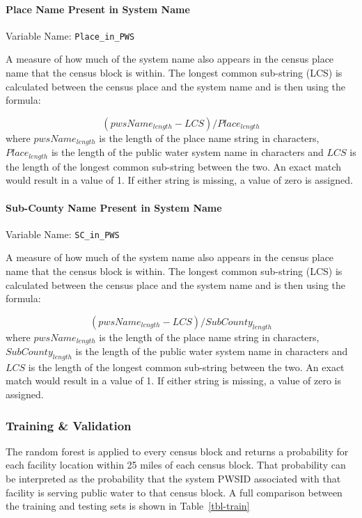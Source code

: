\documentclass[
  letterpaper,
  DIV=11,
  numbers=noendperiod,
  oneside]{scrartcl}
\let\oldparagraph\paragraph
\renewcommand{\paragraph}[1]{\oldparagraph{#1}\mbox{}}
\begin{document}
\paragraph{Place Name Present in System
Name}\label{place-name-present-in-system-name}

Variable Name: \texttt{Place\_in\_PWS}

A measure of how much of the system name also appears in the census
place name that the census block is within. The longest common
sub-string (LCS) is calculated between the census place and the system
name and is then using the formula:

\[(pwsName_{length}-LCS)/Place_{length}\] where \(pwsName_{length}\) is
the length of the place name string in characters, \(Place_{length}\) is
the length of the public water system name in characters and \(LCS\) is
the length of the longest common sub-string between the two. An exact
match would result in a value of 1. If either string is missing, a value
of zero is assigned.

\paragraph{Sub-County Name Present in System
Name}\label{sub-county-name-present-in-system-name}

Variable Name: \texttt{SC\_in\_PWS}

A measure of how much of the system name also appears in the census
place name that the census block is within. The longest common
sub-string (LCS) is calculated between the census place and the system
name and is then using the formula:

\[(pwsName_{length}-LCS)/SubCounty_{length}\] where \(pwsName_{length}\)
is the length of the place name string in characters,
\(SubCounty_{length}\) is the length of the public water system name in
characters and \(LCS\) is the length of the longest common sub-string
between the two. An exact match would result in a value of 1. If either
string is missing, a value of zero is assigned.

\subsubsection{Training \& Validation}\label{training-validation}

The random forest is applied to every census block and returns a
probability for each facility location within 25 miles of each census
block. That probability can be interpreted as the probability that the
system PWSID associated with that facility is serving public water to
that census block. A full comparison between the training and testing
sets is shown in Table~\ref{tbl-train}
\end{document}
